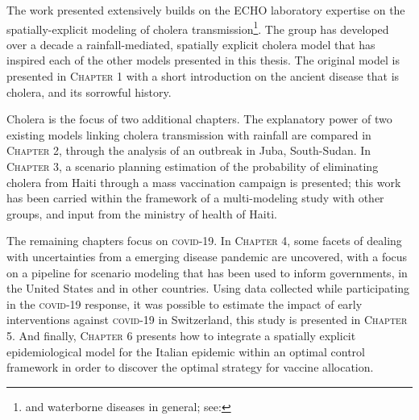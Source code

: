 The work presented extensively builds on the ECHO laboratory expertise on the spatially-explicit modeling of cholera transmission\footnote[][2\baselineskip]{and waterborne diseases in general; see: }. The group has developed over a decade a rainfall-mediated, spatially explicit cholera model that has inspired each of the other models presented in this thesis. The original model is presented in \textsc{Chapter 1} with a short introduction on the ancient disease that is cholera, and its sorrowful history.

Cholera is the focus of two additional chapters. The explanatory power of two existing models linking cholera transmission with rainfall are compared in \textsc{Chapter 2}, through the analysis of an outbreak in Juba, South-Sudan. In \textsc{Chapter 3}, a scenario planning estimation of the probability of eliminating cholera from Haiti through a mass vaccination campaign is presented; this work has been carried within the framework of a multi-modeling study with other groups, and input from the ministry of health of Haiti.

The remaining chapters focus on \textsc{covid}-19. In \textsc{Chapter 4}, some facets of dealing with uncertainties from a emerging disease pandemic are uncovered, with a focus on a pipeline for scenario modeling that has been used to inform governments, in the United States and in other countries. 
Using data collected while participating in the \textsc{covid}-19 response, it was possible to estimate the impact of early interventions against \textsc{covid}-19 in Switzerland, this study is presented in \textsc{Chapter 5}. %
And finally, \textsc{Chapter 6} presents how to integrate a spatially explicit epidemiological model for the Italian epidemic within an optimal control framework in order to discover the optimal strategy for vaccine allocation.



